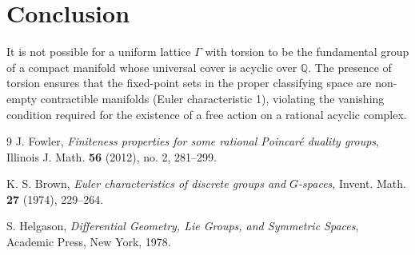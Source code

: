 \documentclass[11pt]{article}
\theoremstyle{plain}
\theoremstyle{definition}
\begin{document}
\section{Conclusion}

It is not possible for a uniform lattice $\Gamma$ with torsion to be the fundamental group of a compact manifold whose universal cover is acyclic over $\mathbb{Q}$. The presence of torsion ensures that the fixed-point sets in the proper classifying space are non-empty contractible manifolds (Euler characteristic 1), violating the vanishing condition required for the existence of a free action on a rational acyclic complex.

\begin{thebibliography}{9}
J. Fowler, \emph{Finiteness properties for some rational Poincaré duality groups}, Illinois J. Math. \textbf{56} (2012), no. 2, 281--299.

K. S. Brown, \emph{Euler characteristics of discrete groups and $G$-spaces}, Invent. Math. \textbf{27} (1974), 229--264.

S. Helgason, \emph{Differential Geometry, Lie Groups, and Symmetric Spaces}, Academic Press, New York, 1978.
\end{thebibliography}
\end{document}
